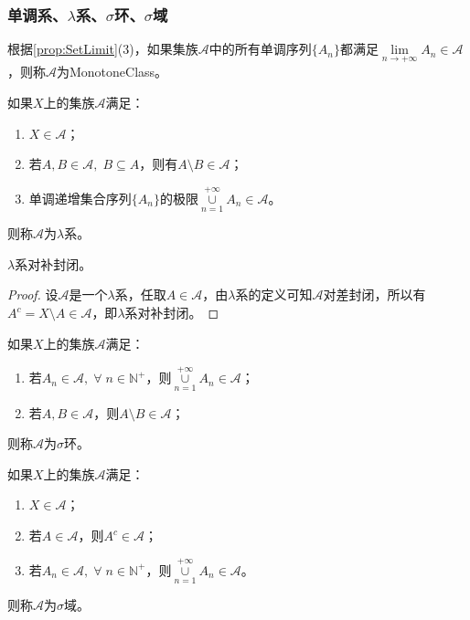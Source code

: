 \subsubsection{单调系、$\lambda$系、$\sigma$环、$\sigma$域}
\begin{definition}
	根据\cref{prop:SetLimit}(3)，如果集族$\mathscr{A}$中的所有单调序列$\{A_n\}$都满足$\lim\limits_{n\to+\infty}A_n\in\mathscr{A}$，则称$\mathscr{A}$为\gls{MonotoneClass}。
\end{definition}
\begin{definition}
	如果$X$上的集族$\mathscr{A}$满足：
	\begin{enumerate}
		\item $X\in\mathscr{A}$；
		\item 若$A,B\in\mathscr{A},\;B\subseteq A$，则有$A\setminus B\in\mathscr{A}$；
		\item 单调递增集合序列$\{A_n\}$的极限$\underset{n=1}{\overset{+\infty}{\cup}}A_n\in\mathscr{A}$。
	\end{enumerate}
	则称$\mathscr{A}$为$\lambda$系。
\end{definition}
\begin{property}\label{prop:lambda-System}
	$\lambda$系对补封闭。
\end{property}
\begin{proof}
	设$\mathscr{A}$是一个$\lambda$系，任取$A\in\mathscr{A}$，由$\lambda$系的定义可知$\mathscr{A}$对差封闭，所以有$A^c=X\setminus A\in\mathscr{A}$，即$\lambda$系对补封闭。
\end{proof}
\begin{definition}
	如果$X$上的集族$\mathscr{A}$满足：
	\begin{enumerate}
		\item 若$A_n\in\mathscr{A},\;\forall\;n\in\mathbb{N}^+$，则$\underset{n=1}{\overset{+\infty}{\cup}}A_n\in\mathscr{A}$；
		\item 若$A,B\in\mathscr{A}$，则$A\setminus B\in\mathscr{A}$；
	\end{enumerate}
	则称$\mathscr{A}$为$\sigma$环。
\end{definition}
\begin{definition}
	如果$X$上的集族$\mathscr{A}$满足：
	\begin{enumerate}
		\item $X\in\mathscr{A}$；
		\item 若$A\in\mathscr{A}$，则$A^c\in\mathscr{A}$；
		\item 若$A_n\in\mathscr{A},\;\forall\;n\in\mathbb{N}^+$，则$\underset{n=1}{\overset{+\infty}{\cup}}A_n\in\mathscr{A}$。
	\end{enumerate}
	则称$\mathscr{A}$为$\sigma$域。
\end{definition}
